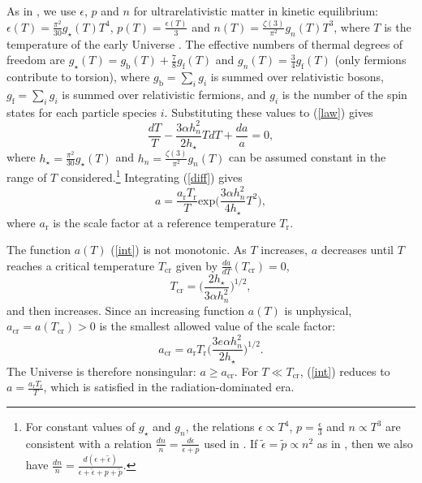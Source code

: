 \documentclass[prd,onecolumn,nofootinbib,showpacs]{revtex4}
\begin{document}
As in \cite{th}, we use $\epsilon$, $p$ and $n$ for ultrarelativistic matter in kinetic equilibrium: $\epsilon(T)=\frac{\pi^2}{30}g_\star(T)T^4$, $p(T)=\frac{\epsilon(T)}{3}$ and $n(T)=\frac{\zeta(3)}{\pi^2}g_n(T)T^3$, where $T$ is the temperature of the early Universe \cite{cosmo}.
The effective numbers of thermal degrees of freedom are $g_\star(T)=g_\textrm{b}(T)+\frac{7}{8}g_\textrm{f}(T)$ and $g_n(T)=\frac{3}{4}g_\textrm{f}(T)$ (only fermions contribute to torsion), where $g_\textrm{b}=\sum_i g_i$ is summed over relativistic bosons, $g_\textrm{f}=\sum_i g_i$ is summed over relativistic fermions, and $g_i$ is the number of the spin states for each particle species $i$.
Substituting these values to (\ref{law}) gives
\begin{equation}
\frac{dT}{T}-\frac{3\alpha h^2_n}{2h_\star}TdT+\frac{da}{a}=0,
\label{diff}
\end{equation}
where $h_\star=\frac{\pi^2}{30}g_\star(T)$ and $h_n=\frac{\zeta(3)}{\pi^2}g_n(T)$ can be assumed constant in the range of $T$ considered.\footnote{
For constant values of $g_\star$ and $g_n$, the relations $\epsilon\propto T^4$, $p=\frac{\epsilon}{3}$ and $n\propto T^3$ are consistent with a relation $\frac{dn}{n}=\frac{d\epsilon}{\epsilon+p}$ used in \cite{infl}.
If $\tilde{\epsilon}=\tilde{p}\propto n^2$ as in \cite{avert,average,infl}, then we also have $\frac{dn}{n}=\frac{d(\epsilon+\tilde{\epsilon})}{\epsilon+\tilde{\epsilon}+p+\tilde{p}}$.
}
Integrating (\ref{diff}) gives
\begin{equation}
a=\frac{a_\textrm{r} T_\textrm{r}}{T}\mbox{exp}\biggl(\frac{3\alpha h^2_n}{4 h_\star}T^2\biggr),
\label{int}
\end{equation}
where $a_\textrm{r}$ is the scale factor at a reference temperature $T_\textrm{r}$.

The function $a(T)$ (\ref{int}) is not monotonic.
As $T$ increases, $a$ decreases until $T$ reaches a critical temperature $T_\textrm{cr}$ given by $\frac{da}{dT}(T_\textrm{cr})=0$,
\begin{equation}
T_\textrm{cr}=\biggl(\frac{2h_\star}{3\alpha h^2_n}\biggr)^{1/2},
\label{critical}
\end{equation}
and then increases.
Since an increasing function $a(T)$ is unphysical, $a_\textrm{cr}=a(T_\textrm{cr})>0$ is the smallest allowed value of the scale factor:
\begin{equation}
a_\textrm{cr}=a_\textrm{r} T_\textrm{r}\biggl(\frac{3e\alpha h^2_n}{2h_\star}\biggr)^{1/2}.
\label{minimum}
\end{equation}
The Universe is therefore nonsingular: $a\ge a_\textrm{cr}$.
For $T\ll T_\textrm{cr}$, (\ref{int}) reduces to $a=\frac{a_\textrm{r} T_\textrm{r}}{T}$, which is satisfied in the radiation-dominated era.
\end{document}
